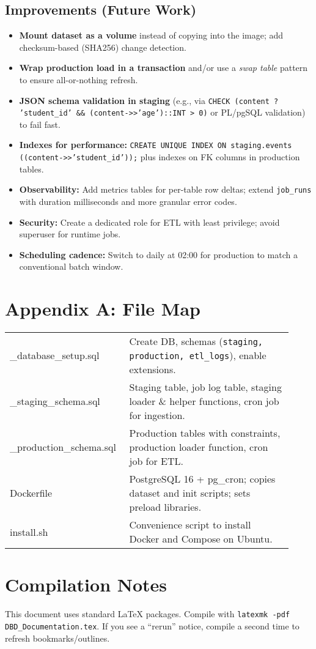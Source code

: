 \documentclass[11pt]{article}
\begin{document}
\subsection*{Improvements (Future Work)}
\begin{itemize}[leftmargin=1.2em]
  \item \textbf{Mount dataset as a volume} instead of copying into the image; add checksum-based (SHA256) change detection.
  \item \textbf{Wrap production load in a transaction} and/or use a \emph{swap table} pattern to ensure all-or-nothing refresh.
  \item \textbf{JSON schema validation in staging} (e.g., via \texttt{CHECK (content ? 'student\_id' \&\& (content->>'age')::INT > 0)} or PL/pgSQL validation) to fail fast.
  \item \textbf{Indexes for performance:} \texttt{CREATE UNIQUE INDEX ON staging.events ((content->>'student\_id'));} plus indexes on FK columns in production tables.
  \item \textbf{Observability:} Add metrics tables for per-table row deltas; extend \texttt{job\_runs} with duration milliseconds and more granular error codes.
  \item \textbf{Security:} Create a dedicated role for ETL with least privilege; avoid superuser for runtime jobs.
  \item \textbf{Scheduling cadence:} Switch to daily at 02:00 for production to match a conventional batch window.
\end{itemize}

\section*{Appendix A: File Map}
\begin{longtable}{>{\ttfamily}p{0.36\linewidth}p{0.56\linewidth}}
\toprule
01\_database\_setup.sql & Create DB, schemas (\texttt{staging, production, etl\_logs}), enable extensions.\\
02\_staging\_schema.sql & Staging table, job log table, staging loader \& helper functions, cron job for ingestion.\\
03\_production\_schema.sql & Production tables with constraints, production loader function, cron job for ETL.\\
Dockerfile & PostgreSQL 16 + pg\_cron; copies dataset and init scripts; sets preload libraries.\\
install.sh & Convenience script to install Docker and Compose on Ubuntu.\\
\bottomrule
\end{longtable}

\section*{Compilation Notes}
This document uses standard \LaTeX{} packages. Compile with \texttt{latexmk -pdf DBD\_Documentation.tex}. If you see a ``rerun'' notice, compile a second time to refresh bookmarks/outlines.
\end{document}
